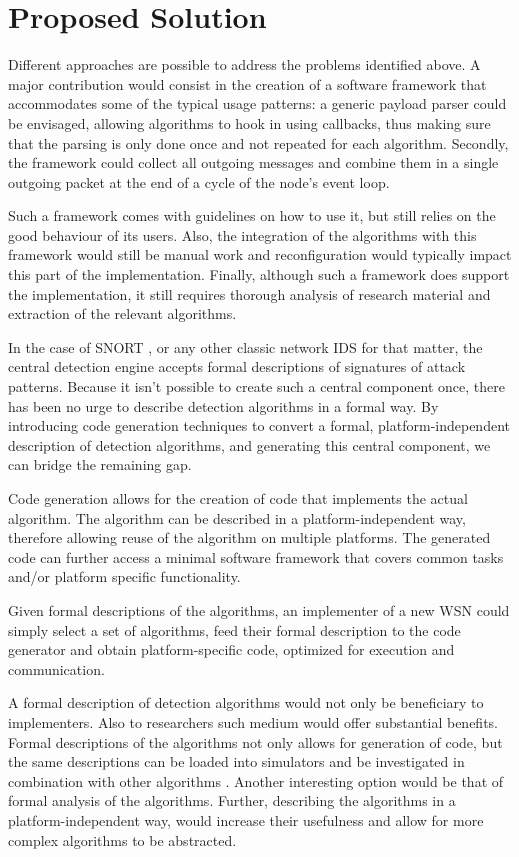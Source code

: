 \documentclass[conference]{IEEEtran}
\begin{document}
\section{Proposed Solution}
\label{section:solution}

Different approaches are possible to address the problems identified above. A
major contribution would consist in the creation of a software framework that
accommodates some of the typical usage patterns: a generic payload parser could
be envisaged, allowing algorithms to hook in using callbacks, thus making sure
that the parsing is only done once and not repeated for each algorithm.
Secondly, the framework could collect all outgoing messages and combine them in
a single outgoing packet at the end of a cycle of the node's event loop.

Such a framework comes with guidelines on how to use it, but still relies on
the good behaviour of its users. Also, the integration of the algorithms with
this framework would still be manual work and reconfiguration would typically
impact this part of the implementation. Finally, although such a framework does
support the implementation, it still requires thorough analysis of research
material and extraction of the relevant algorithms.

In the case of SNORT \cite{roesch1999snort}, or any other classic network IDS
for that matter, the central detection engine accepts formal descriptions of
signatures of attack patterns. Because it isn't possible to create such a
central component once, there has been no urge to describe detection algorithms
in a formal way. By introducing code generation techniques to convert a formal,
platform-independent description of detection algorithms, and generating this
central component, we can bridge the remaining gap.

Code generation allows for the creation of code that implements the actual
algorithm. The algorithm can be described in a platform-independent way,
therefore allowing reuse of the algorithm on multiple platforms. The generated
code can further access a minimal software framework that covers common tasks
and/or platform specific functionality.

Given formal descriptions of the algorithms, an implementer of a new WSN could
simply select a set of algorithms, feed their formal description to the code
generator and obtain platform-specific code, optimized for execution and
communication.

A formal description of detection algorithms would not only be beneficiary to
implementers. Also to researchers such medium would offer substantial benefits.
Formal descriptions of the algorithms not only allows for generation of code,
but the same descriptions can be loaded into simulators and be investigated in
combination with other algorithms \cite{mernik2005and}. Another interesting
option would be that of formal analysis of the algorithms. Further, describing
the algorithms in a platform-independent way, would increase their usefulness
and allow for more complex algorithms to be abstracted.
\end{document}
